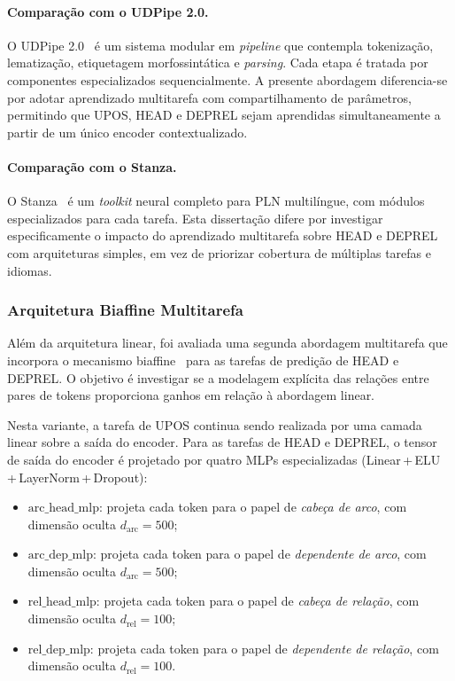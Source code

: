\paragraph{Comparação com o UDPipe 2.0.}
O UDPipe 2.0~\citep{straka2017tokenizing} é um sistema modular em \textit{pipeline} que
contempla tokenização, lematização, etiquetagem morfossintática e \textit{parsing}. Cada etapa
é tratada por componentes especializados sequencialmente. A presente abordagem diferencia-se
por adotar aprendizado multitarefa com compartilhamento de parâmetros, permitindo que UPOS,
HEAD e DEPREL sejam aprendidas simultaneamente a partir de um único encoder contextualizado.

\paragraph{Comparação com o Stanza.}
O Stanza~\citep{qi-etal-2020-stanza} é um \textit{toolkit} neural completo para PLN
multilíngue, com módulos especializados para cada tarefa. Esta dissertação difere por
investigar especificamente o impacto do aprendizado multitarefa sobre HEAD e DEPREL com
arquiteturas simples, em vez de priorizar cobertura de múltiplas tarefas e idiomas.

\subsubsection*{Arquitetura Biaffine Multitarefa}

Além da arquitetura linear, foi avaliada uma segunda abordagem multitarefa que incorpora o
mecanismo biaffine~\citep{dozat2016deep} para as tarefas de predição de HEAD e DEPREL. O
objetivo é investigar se a modelagem explícita das relações entre pares de tokens proporciona
ganhos em relação à abordagem linear.

Nesta variante, a tarefa de UPOS continua sendo realizada por uma camada linear sobre a saída
do encoder. Para as tarefas de HEAD e DEPREL, o tensor de saída do encoder é projetado por
quatro MLPs especializadas (Linear\,+\,ELU\,+\,LayerNorm\,+\,Dropout):

\begin{itemize}
    \item $\text{arc\_head\_mlp}$: projeta cada token para o papel de \textit{cabeça de arco},
          com dimensão oculta $d_\text{arc} = 500$;
    \item $\text{arc\_dep\_mlp}$: projeta cada token para o papel de \textit{dependente de arco},
          com dimensão oculta $d_\text{arc} = 500$;
    \item $\text{rel\_head\_mlp}$: projeta cada token para o papel de \textit{cabeça de relação},
          com dimensão oculta $d_\text{rel} = 100$;
    \item $\text{rel\_dep\_mlp}$: projeta cada token para o papel de \textit{dependente de
          relação}, com dimensão oculta $d_\text{rel} = 100$.
\end{itemize}

